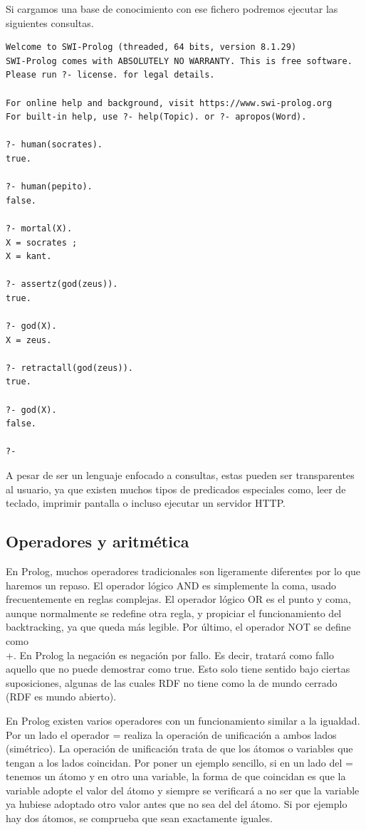 \documentclass[12pt]{report} %
\begin{document}
Si cargamos una base de conocimiento con ese fichero podremos ejecutar las siguientes consultas.

\begin{verbatim}
Welcome to SWI-Prolog (threaded, 64 bits, version 8.1.29)
SWI-Prolog comes with ABSOLUTELY NO WARRANTY. This is free software.
Please run ?- license. for legal details.

For online help and background, visit https://www.swi-prolog.org
For built-in help, use ?- help(Topic). or ?- apropos(Word).

?- human(socrates).
true.

?- human(pepito).
false.

?- mortal(X).
X = socrates ;
X = kant.

?- assertz(god(zeus)).
true.

?- god(X).
X = zeus.

?- retractall(god(zeus)).
true.

?- god(X).
false.

?- 
\end{verbatim}

A pesar de ser un lenguaje enfocado a consultas, estas pueden ser transparentes al usuario, ya que existen muchos tipos de predicados especiales como, leer de teclado, imprimir pantalla o incluso ejecutar un servidor HTTP.

\subsection{Operadores y aritmética}

En Prolog, muchos operadores tradicionales son ligeramente diferentes por lo que haremos un repaso. El operador lógico AND es simplemente la coma, usado frecuentemente en reglas complejas. El operador lógico OR es el punto y coma, aunque normalmente se redefine otra regla, y propiciar el funcionamiento del backtracking, ya que queda más legible. Por último, el operador NOT se define como \\+. En Prolog la negación es negación por fallo. Es decir, tratará como fallo aquello que no puede demostrar como true. Esto solo tiene sentido bajo ciertas suposiciones, algunas de las cuales RDF no tiene como la de mundo cerrado (RDF es mundo abierto).

En Prolog existen varios operadores con un funcionamiento similar a la igualdad. Por un lado el operador = realiza la operación de unificación a ambos lados (simétrico). La operación de unificación trata de que los átomos o variables que tengan a los lados coincidan. Por poner un ejemplo sencillo, si en un lado del = tenemos un átomo y en otro una variable, la forma de que coincidan es que la variable adopte el valor del átomo y siempre se verificará a no ser que la variable ya hubiese adoptado otro valor antes que no sea del del átomo. Si por ejemplo hay dos átomos, se comprueba que sean exactamente iguales.
\end{document}
